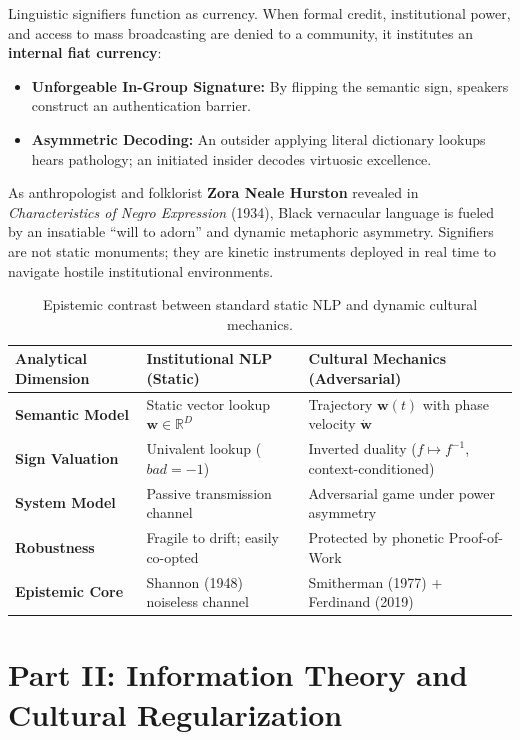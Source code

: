 \documentclass[11pt,letterpaper]{article}
\begin{document}
Linguistic signifiers function as currency. When formal credit, institutional power, and access to mass broadcasting are denied to a community, it institutes an \textbf{internal fiat currency}:
\begin{itemize}[itemsep=2pt, topsep=2pt]
    \item \textbf{Unforgeable In-Group Signature:} By flipping the semantic sign, speakers construct an authentication barrier.
    \item \textbf{Asymmetric Decoding:} An outsider applying literal dictionary lookups hears pathology; an initiated insider decodes virtuosic excellence.
\end{itemize}

As anthropologist and folklorist \textbf{Zora Neale Hurston} revealed in \textit{Characteristics of Negro Expression} (1934), Black vernacular language is fueled by an insatiable ``will to adorn'' and dynamic metaphoric asymmetry. Signifiers are not static monuments; they are kinetic instruments deployed in real time to navigate hostile institutional environments.

\begin{table}[htbp]
\centering
\small
\begin{tabular}{@{}p{3.8cm} p{5.2cm} p{6.5cm}@{}}
\toprule
\textbf{Analytical Dimension} & \textbf{Institutional NLP (Static)} & \textbf{Cultural Mechanics (Adversarial)} \\ \midrule
\textbf{Semantic Model} & Static vector lookup $\mathbf{w} \in \mathbb{R}^D$ & Trajectory $\mathbf{w}(t)$ with phase velocity $\dot{\mathbf{w}}$ \\
\textbf{Sign Valuation} & Univalent lookup ($bad = -1$) & Inverted duality ($f \mapsto f^{-1}$, context-conditioned) \\
\textbf{System Model} & Passive transmission channel & Adversarial game under power asymmetry \\
\textbf{Robustness} & Fragile to drift; easily co-opted & Protected by phonetic Proof-of-Work \\
\textbf{Epistemic Core} & Shannon (1948) noiseless channel & Smitherman (1977) + Ferdinand (2019) \\ \bottomrule
\end{tabular}
\caption{Epistemic contrast between standard static NLP and dynamic cultural mechanics.}
\label{tab:nlp_comparison}
\end{table}

\section{Part II: Information Theory and Cultural Regularization}
\end{document}
